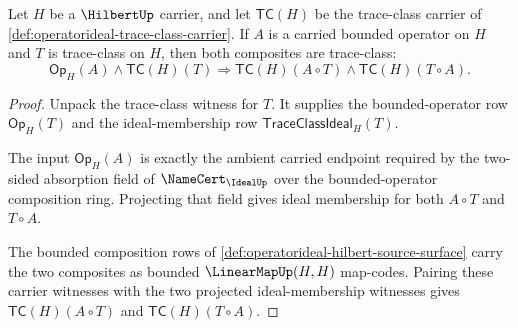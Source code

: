 \begin{theorem}
\label{thm:operatorideal-two-sided-absorption-row}
Let $H$ be a $\HilbertUp$ carrier, and let $\mathsf{TC}(H)$ be the trace-class carrier of \autoref{def:operatorideal-trace-class-carrier}. If $A$ is a carried bounded operator on $H$ and $T$ is trace-class on $H$, then both composites are trace-class:
$$
\mathsf{Op}_H(A)\land\mathsf{TC}(H)(T)
\Longrightarrow
\mathsf{TC}(H)(A\circ T)\land\mathsf{TC}(H)(T\circ A).
$$
\end{theorem}
\begin{proof}
Unpack the trace-class witness for $T$. It supplies the bounded-operator row $\mathsf{Op}_H(T)$ and the ideal-membership row $\mathsf{TraceClassIdeal}_H(T)$.

The input $\mathsf{Op}_H(A)$ is exactly the ambient carried endpoint required by the two-sided absorption field of $\NameCert_{\IdealUp}$ over the bounded-operator composition ring. Projecting that field gives ideal membership for both $A\circ T$ and $T\circ A$.

The bounded composition rows of \autoref{def:operatorideal-hilbert-source-surface} carry the two composites as bounded $\LinearMapUp(H,H)$ map-codes. Pairing these carrier witnesses with the two projected ideal-membership witnesses gives $\mathsf{TC}(H)(A\circ T)$ and $\mathsf{TC}(H)(T\circ A)$.
\end{proof}

